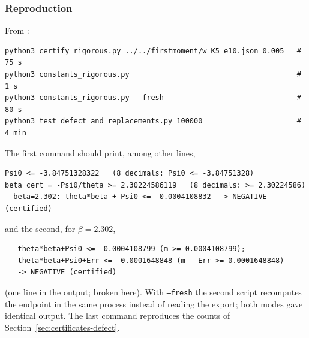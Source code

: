 \subsubsection*{Reproduction}
From :
{\footnotesize
\begin{verbatim}
python3 certify_rigorous.py ../../firstmoment/w_K5_e10.json 0.005   # 75 s
python3 constants_rigorous.py                                       # 1 s
python3 constants_rigorous.py --fresh                               # 80 s
python3 test_defect_and_replacements.py 100000                      # 4 min
\end{verbatim}}
The first command should print, among other lines,
{\footnotesize
\begin{verbatim}
Psi0 <= -3.84751328322   (8 decimals: Psi0 <= -3.84751328)
beta_cert = -Psi0/theta >= 2.30224586119   (8 decimals: >= 2.30224586)
  beta=2.302: theta*beta + Psi0 <= -0.0004108832  -> NEGATIVE (certified)
\end{verbatim}}
and the second, for $\beta=2.302$,
{\footnotesize
\begin{verbatim}
   theta*beta+Psi0 <= -0.0004108799 (m >= 0.0004108799);
   theta*beta+Psi0+Err <= -0.0001648848 (m - Err >= 0.0001648848)
   -> NEGATIVE (certified)
\end{verbatim}}
(one line in the output; broken here). With \texttt{--fresh} the second script recomputes
the endpoint in the same process instead of reading the export; both modes gave identical
output. The last command reproduces the counts of Section~\ref{sec:certificates-defect}.

